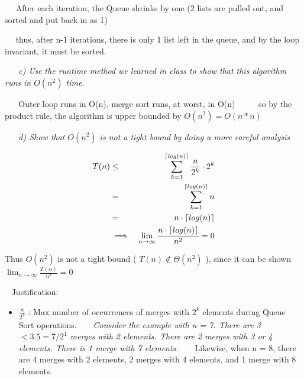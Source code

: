 \documentclass[12pt, letterpaper]{article}
\DeclarePairedDelimiter{\ceil}{\lceil}{\rceil}
\begin{document}
\begin{enumerate}
    \-\ \newline
    \-\ \textnormal{After each iteration, the Queue shrinks by one (2 lists are pulled out, and sorted and put back in as 1)}

    \-\ \newline
    \-\ \textnormal{thus, after n-1 iterations, there is only 1 list left in the queue, and by the loop invariant, it must be sorted.}

     \-\ \newline
     \-\ \newline
     \it{ c) Use the runtime method we learned in class to show that this algorithm runs in \(O(n^{2})\) time. }

     \-\ \newline
     \-\ \textnormal{ Outer loop runs in O(n), merge sort runs, at worst, in O(n) }
     \-\ \newline
     \-\ \newline
     \-\ \textnormal{ so by the product rule, the algorithm is upper bounded by \(O(n^{2}) = O(n * n) \) }

     \-\ \newline
     \-\ \newline
     \it{ d) Show that \(O(n^2)\) is not a tight bound by doing a more careful analysis }

     \begin{eqnarray}
        T(n) &\le& \sum_{k=1}^{\ceil{log(n)}} \frac{n}{2^k} \cdot 2^k \\
        &=& \sum_{k=1}^{\ceil{log(n)}} n \\
        &=& n \cdot \ceil{log(n)} \\
        &\implies& \lim_{n \rightarrow \infty} \frac{n \cdot \ceil{log(n)}}{n^2} = 0
    \end{eqnarray}

    \textnormal{Thus \(O(n^2)\) is not a tight bound ( \(T(n) \notin \Theta(n^2)\) ), since it can be shown \( \lim_{n \rightarrow \infty} \frac{T(n)}{n^2} = 0 \)}

    \-\ \newline
    Justification:
    \begin{itemize}
        \item \textnormal{\( \frac{n}{2^k}\) : Max number of occurrences of merges with \(2^{k}\) elements during Queue Sort operations.
        \-\ \newline
        \-\ \newline
        \emph{Consider the example with n = 7. There are 3 \(< 3.5 = 7 / 2^1\) merges with 2 elements. There are 2 merges with 3 or 4 elements. There is 1 merge with 7 elements. }}
        \-\ \newline
        \-\ \newline
        Likewise, when n = 8, there are 4 merges with 2 elements, 2 merges with 4 elements, and 1 merge with 8 elements. 


\end{itemize}
\end{enumerate}
\end{document}
